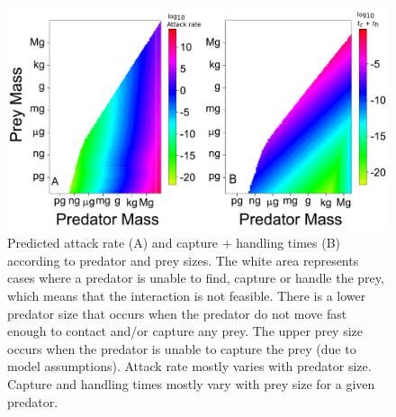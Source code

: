 \documentclass[utf8, 12 pt]{frontiers_suppmat}
\begin{document}
\clearpage
\begin{figure}[ht]
\begin{center}
\doublespacing
\includegraphics[width = 18 cm, keepaspectratio]{Attack_Rate_Map2}
\caption{Predicted attack rate (A) and capture + handling times (B) according to predator and prey sizes. The white area represents cases where a predator is unable to find, capture or handle the prey, which means that the interaction is not feasible. There is a lower predator size that occurs when the predator do not move fast enough to contact and/or capture any prey. The upper prey size occurs when the predator is unable to capture the prey (due to model assumptions). Attack rate mostly varies with predator size. Capture and handling times mostly vary with prey size for a given predator.}
\end{center}
\end{figure}
\end{document}
